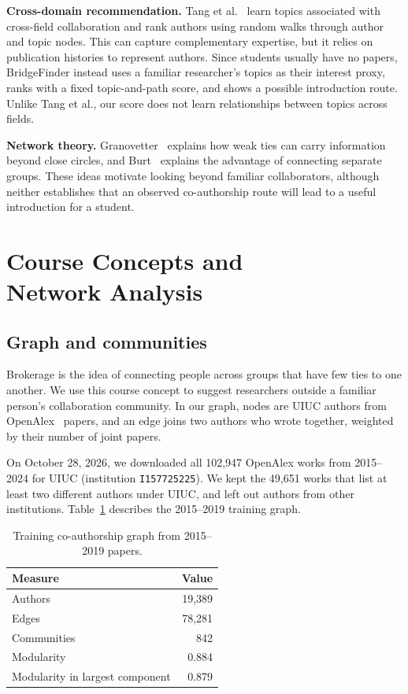 \documentclass[10pt,twocolumn,letterpaper]{article}
\begin{document}
\textbf{Cross-domain recommendation.} Tang et al.~\cite{tang2012} learn topics associated with cross-field collaboration and rank authors using random walks through author and topic nodes. This can capture complementary expertise, but it relies on publication histories to represent authors. Since students usually have no papers, BridgeFinder instead uses a familiar researcher's topics as their interest proxy, ranks with a fixed topic-and-path score, and shows a possible introduction route. Unlike Tang et al., our score does not learn relationships between topics across fields.

\textbf{Network theory.} Granovetter~\cite{granovetter1973} explains how weak ties can carry information beyond close circles, and Burt~\cite{burt1992} explains the advantage of connecting separate groups. These ideas motivate looking beyond familiar collaborators, although neither establishes that an observed co-authorship route will lead to a useful introduction for a student.

\section{\texorpdfstring{Course Concepts and\\Network Analysis}{Course Concepts and Network Analysis}}
\subsection{Graph and communities}
Brokerage is the idea of connecting people across groups that have few ties to one another. We use this course concept to suggest researchers outside a familiar person's collaboration community. In our graph, nodes are UIUC authors from OpenAlex~\cite{openalex} papers, and an edge joins two authors who wrote together, weighted by their number of joint papers.

On October 28, 2026, we downloaded all 102,947 OpenAlex works from 2015--2024 for UIUC (institution \texttt{I157725225}). We kept the 49,651 works that list at least two different authors under UIUC, and left out authors from other institutions. Table~\ref{tab:network} describes the 2015--2019 training graph.

\begin{table}[!ht]
\centering\small
\setlength{\tabcolsep}{4pt}
\caption{Training co-authorship graph from 2015--2019 papers.}
\label{tab:network}
\renewcommand{\arraystretch}{1.1}
\begin{tabularx}{\columnwidth}{@{}Xr@{}}
\toprule
Measure & Value\\
\midrule
Authors & 19,389\\
Edges & 78,281\\
Communities & 842\\
Modularity & 0.884\\
Modularity in largest component & 0.879\\
\bottomrule
\end{tabularx}
\end{table}
\end{document}
